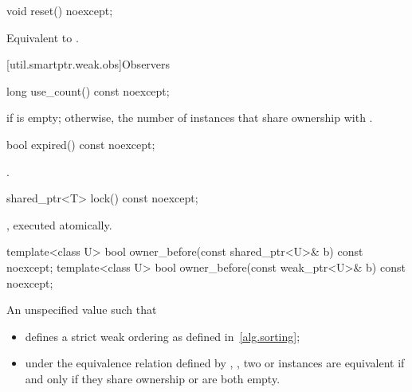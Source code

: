 %
\begin{itemdecl}
void reset() noexcept;
\end{itemdecl}

\begin{itemdescr}
\pnum\effects  Equivalent to .
\end{itemdescr}

[util.smartptr.weak.obs]{Observers}
%
\begin{itemdecl}
long use_count() const noexcept;
\end{itemdecl}

\begin{itemdescr}
\pnum\returns  {} if  is empty;
otherwise, the number of  instances
that share ownership with .
\end{itemdescr}

%
\begin{itemdecl}
bool expired() const noexcept;
\end{itemdecl}

\begin{itemdescr}
\pnum\returns  {}.
\end{itemdescr}

%
\begin{itemdecl}
shared_ptr<T> lock() const noexcept;
\end{itemdecl}

\begin{itemdescr}
\pnum
\returns {}, executed atomically.
\end{itemdescr}

%
\begin{itemdecl}
template<class U> bool owner_before(const shared_ptr<U>& b) const noexcept;
template<class U> bool owner_before(const weak_ptr<U>& b) const noexcept;
\end{itemdecl}

\begin{itemdescr}
\pnum
\returns An unspecified value such that

\begin{itemize}
\item {} defines a strict weak ordering as defined in~\ref{alg.sorting};

\item under the equivalence relation defined by ,
, two  or
 instances are equivalent if and only if they share ownership or are
both empty.
\end{itemize}
\end{itemdescr}


